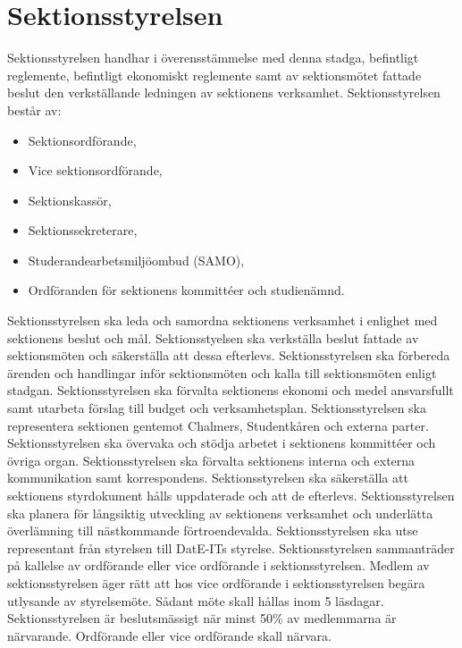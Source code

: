 \documentclass[a4paper]{dteklag}
\begin{document}
\section{Sektionsstyrelsen}
 Sektionsstyrelsen handhar i överensstämmelse med denna stadga, befintligt reglemente, befintligt ekonomiskt reglemente samt av sektionsmötet fattade beslut den verkställande ledningen av sektionens verksamhet.
\para Sektionsstyrelsen består av:
\begin{itemize}\setlength\itemsep{0em}
\item Sektionsordförande,
\item Vice sektionsordförande,
\item Sektionskassör,
\item Sektionssekreterare,
\item Studerandearbetsmiljöombud (SAMO),
\item Ordföranden för sektionens kommittéer och studienämnd.
\end{itemize} 
\para[Åligganden] Sektionsstyrelsen ska leda och samordna sektionens verksamhet i enlighet med sektionens beslut och mål.
\para Sektionsstyelsen ska verkställa beslut fattade av sektionsmöten och säkerställa att dessa efterlevs.
\para Sektionsstyrelsen ska förbereda ärenden och handlingar inför sektionsmöten och kalla till sektionsmöten enligt stadgan.
\para Sektionsstyrelsen ska förvalta sektionens ekonomi och medel ansvarsfullt samt utarbeta förslag till budget och verksamhetsplan.
\para Sektionsstyrelsen ska representera sektionen gentemot Chalmers, Studentkåren och externa parter.
\para Sektionsstyrelsen ska övervaka och stödja arbetet i sektionens kommittéer och övriga organ.
\para Sektionsstyrelsen ska förvalta sektionens interna och externa kommunikation samt korrespondens.
\para Sektionsstyrelsen ska säkerställa att sektionens styrdokument hålls uppdaterade och att de efterlevs.
\para Sektionsstyrelsen ska planera för långsiktig utveckling av sektionens verksamhet och underlätta överlämning till nästkommande förtroendevalda.
\para Sektionsstyrelsen ska utse representant från styrelsen till DatE-ITs styrelse.
\para[Styrelsemöte] Sektionsstyrelsen sammanträder på kallelse av ordförande eller vice ordförande i sektionsstyrelsen.
\para Medlem av sektionsstyrelsen äger rätt att hos vice ordförande i sektionsstyrelsen begära utlysande av styrelsemöte.
\stycke Sådant möte skall hållas inom 5 läsdagar.
\para Sektionsstyrelsen är beslutsmässigt när minst 50\% av medlemmarna är närvarande. Ordförande eller vice ordförande skall närvara.
\end{document}
